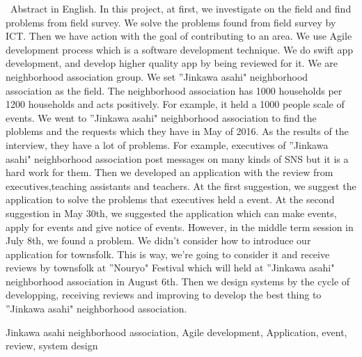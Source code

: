 \begin{eabstract}
\ Abstract in English. In this project, at first, we investigate on the field and find problems from field survey. We solve the problems found from field survey by ICT. Then we have action with the goal of contributing to an area. We use Agile development process which is a software development technique. We do swift app development, and develop higher quality app by being reviewed for it.
We are neighborhood association group. We set ”Jinkawa asahi" neighborhood association as the field.
The neighborhood association has 1000 households per 1200 households and acts positively. For example, it held a 1000 people scale of events. We went to ”Jinkawa asahi" neighborhood association to find the ploblems and the requests which they have in May of 2016. As the results of the interview, they have a lot of problems. For example, executives of ”Jinkawa asahi" neighborhood association post messages on many kinds of SNS but it is a hard work for them. Then we developed an application with the review from executives,teaching assistants and teachers. At the first suggestion, we suggest the application to solve the problems that executives held a event. At the second suggestion in May 30th, we suggested the application which can make events, apply for events and give notice of events. However, in the middle term session in July 8th, we found a problem. We didn't consider how to introduce our application for townsfolk. This is way, we're going to consider it and receive reviews by townsfolk at ”Nouryo" Festival which will held at ”Jinkawa asahi" neighborhood association in August 6th. Then we design systems by the cycle of developping, receiving reviews and improving to develop the best thing to ”Jinkawa asahi" neighborhood association.
\begin{ekeyword}
Jinkawa asahi neighborhood association, Agile development, Application, event, review, system design
\end{ekeyword}
\end{eabstract}
